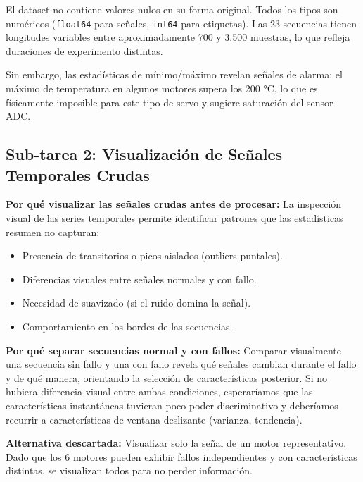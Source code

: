 \documentclass[12pt,a4paper]{article}
\begin{document}
\begin{resultbox}
El dataset no contiene valores nulos en su forma original. Todos los tipos son
numéricos (\texttt{float64} para señales, \texttt{int64} para etiquetas).
Las 23 secuencias tienen longitudes variables entre aproximadamente 700 y 3.500
muestras, lo que refleja duraciones de experimento distintas.

Sin embargo, las estadísticas de mínimo/máximo revelan señales de alarma:
el máximo de temperatura en algunos motores supera los 200 °C, lo que es
físicamente imposible para este tipo de servo y sugiere saturación del sensor ADC.
\end{resultbox}

\subsection{Sub-tarea 2: Visualización de Señales Temporales Crudas}

\begin{whybox}
\textbf{Por qué visualizar las señales crudas antes de procesar:}
La inspección visual de las series temporales permite identificar patrones
que las estadísticas resumen no capturan:
\begin{itemize}[leftmargin=1.5em]
  \item Presencia de transitorios o picos aislados (outliers puntales).
  \item Diferencias visuales entre señales normales y con fallo.
  \item Necesidad de suavizado (si el ruido domina la señal).
  \item Comportamiento en los bordes de las secuencias.
\end{itemize}

\textbf{Por qué separar secuencias normal y con fallos:}
Comparar visualmente una secuencia sin fallo y una con fallo revela qué
señales cambian durante el fallo y de qué manera, orientando la selección
de características posterior. Si no hubiera diferencia visual entre ambas
condiciones, esperaríamos que las características instantáneas tuvieran
poco poder discriminativo y deberíamos recurrir a características de ventana
deslizante (varianza, tendencia).

\textbf{Alternativa descartada:} Visualizar solo la señal de un motor representativo.
Dado que los 6 motores pueden exhibir fallos independientes y con
características distintas, se visualizan todos para no perder información.
\end{whybox}
\end{document}
